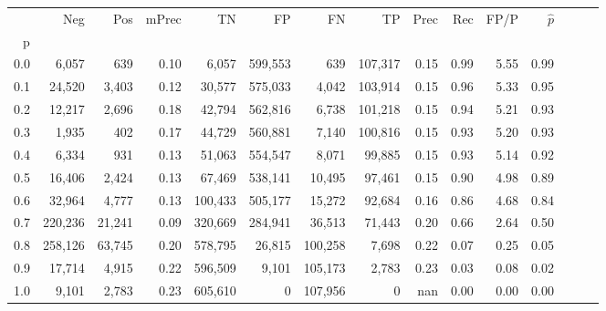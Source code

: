 \begin{tabular}{rrrrrrrrrrrrrrr}
\toprule
{} &      Neg &     Pos & mPrec &       TN &       FP &       FN &       TP &  Prec &   Rec &  FP/P & $\hat{p}$ \\
p   &          &         &       &          &          &          &          &       &       &       &           \\
\midrule
0.0 &    6,057 &     639 &  0.10 &    6,057 &  599,553 &      639 &  107,317 &  0.15 &  0.99 &  5.55 &      0.99 \\
0.1 &   24,520 &   3,403 &  0.12 &   30,577 &  575,033 &    4,042 &  103,914 &  0.15 &  0.96 &  5.33 &      0.95 \\
0.2 &   12,217 &   2,696 &  0.18 &   42,794 &  562,816 &    6,738 &  101,218 &  0.15 &  0.94 &  5.21 &      0.93 \\
0.3 &    1,935 &     402 &  0.17 &   44,729 &  560,881 &    7,140 &  100,816 &  0.15 &  0.93 &  5.20 &      0.93 \\
0.4 &    6,334 &     931 &  0.13 &   51,063 &  554,547 &    8,071 &   99,885 &  0.15 &  0.93 &  5.14 &      0.92 \\
0.5 &   16,406 &   2,424 &  0.13 &   67,469 &  538,141 &   10,495 &   97,461 &  0.15 &  0.90 &  4.98 &      0.89 \\
0.6 &   32,964 &   4,777 &  0.13 &  100,433 &  505,177 &   15,272 &   92,684 &  0.16 &  0.86 &  4.68 &      0.84 \\
0.7 &  220,236 &  21,241 &  0.09 &  320,669 &  284,941 &   36,513 &   71,443 &  0.20 &  0.66 &  2.64 &      0.50 \\
0.8 &  258,126 &  63,745 &  0.20 &  578,795 &   26,815 &  100,258 &    7,698 &  0.22 &  0.07 &  0.25 &      0.05 \\
0.9 &   17,714 &   4,915 &  0.22 &  596,509 &    9,101 &  105,173 &    2,783 &  0.23 &  0.03 &  0.08 &      0.02 \\
1.0 &    9,101 &   2,783 &  0.23 &  605,610 &        0 &  107,956 &        0 &   nan &  0.00 &  0.00 &      0.00 \\
\bottomrule
\end{tabular}
